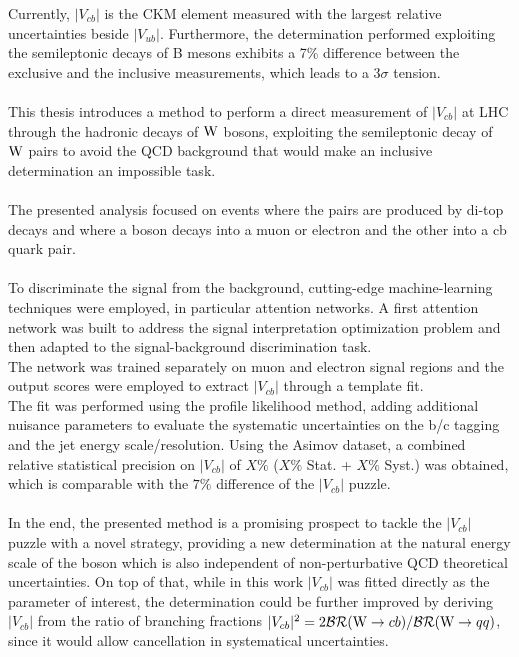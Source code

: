 \label{sec:END}
\vspace{-1cm}
Currently, $|V_{cb}|$ is the CKM element measured with the largest relative uncertainties beside $|V_{ub}|$. Furthermore, the determination performed exploiting the semileptonic decays of B mesons exhibits a 7\% difference between the exclusive and the inclusive measurements, which leads to a $3\sigma$ tension.\\
\\
This thesis introduces a method to perform a direct measurement of $|V_{cb}|$ at LHC through the hadronic decays of ${\text{W}}$ bosons, exploiting the semileptonic decay of ${\text{W}}$ pairs to avoid the QCD background that would make an inclusive determination an impossible task.
\\
\\
The presented analysis focused on events where the \PW pairs are produced by di-top decays and where a \PW boson decays into a muon or electron and the other into a cb quark pair.\\
\\
To discriminate the signal from the background, cutting-edge machine-learning techniques were employed, in particular attention networks. 
A first attention network was built to address the signal interpretation optimization problem and then adapted to the signal-background discrimination task.\\
The network was trained separately on muon and electron signal regions and the output scores were employed to extract $|V_{cb}|$ through a template fit.\\
The fit was performed using the profile likelihood method, adding additional nuisance parameters to evaluate the systematic uncertainties on the b/c tagging and the jet energy scale/resolution.
Using the Asimov dataset, a combined relative statistical precision on $|V_{cb}|$ of $X\%$ ($X\%$ Stat. + $X\%$ Syst.) was obtained, which is comparable with the $7\%$ difference of the $|V_{cb}|$ puzzle.
\\
\\
In the end, the presented method is a promising prospect to tackle the $|V_{cb}|$ puzzle with a novel strategy, providing a new determination at the natural energy scale of the \PW boson which is also independent of non-perturbative QCD theoretical uncertainties.
On top of that, while in this work $|V_{cb}|$ was fitted directly as the parameter of interest, the determination could be further improved by deriving $|V_{cb}|$ from the ratio of branching fractions $|V_{cb}|^2=2\mathcal{BR}({\text{W}} \to cb)/\mathcal{BR}({\text{W}} \to qq)$, since it would allow cancellation in systematical uncertainties.